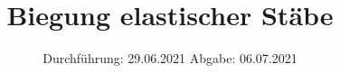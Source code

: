 

\subject{V103}
\title{Biegung elastischer Stäbe}
\date{%
  Durchführung: 29.06.2021
  \hspace{3em}
  Abgabe: 06.07.2021
}



\maketitle
\thispagestyle{empty}
\tableofcontents
\newpage







\printbibliography{}

